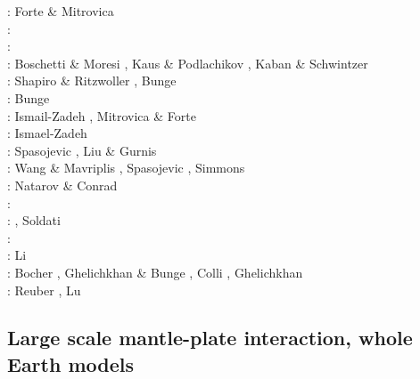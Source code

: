 \begin{scriptsize}
\nineteenninetysix: Forte \& Mitrovica \cite{fomi96} \\
\nineteenninetyeight: \cite{cava98}\\
\nineteenninetynine: \cite{samb99}\cite{samb99b}\\
\twothousandone: Boschetti \& Moresi \cite{bomo01}, Kaus \& Podlachikov \cite{kapo01}, 
                 Kaban \& Schwintzer \cite{kasc01}\\
\twothousandtwo: Shapiro \& Ritzwoller \cite{shri02}, Bunge \etal \cite{burb02}\\
\twothousandthree: Bunge \etal \cite{buht03}\\
\twothousandfour: Ismail-Zadeh \etal \cite{isst04}, Mitrovica \& Forte \cite{mifo04}\\
\twothousandseven: Ismael-Zadeh \etal \cite{isks07}\\
\twothousandeight: Spasojevic \etal \cite{splg08}, Liu \& Gurnis \cite{ligu08}\\
\twothousandnine: Wang \& Mavriplis \cite{wama09}, Spasojevic \etal \cite{splg09},
                  Simmons \etal \cite{sifg09}\\
\twothousandtwelve: Natarov \& Conrad \cite{naco12}\\
\twothousandfourteen: \cite{wosp14}\cite{hobo14}\cite{licl14}\\
\twothousandfifteen: \cite{wahg15}\cite{cobs15}\cite{vybu15}, Soldati \etal \cite{sobd15}\\
\twothousandsixteen: \cite{ghbu16}\cite{bocf16}\cite{yagu16}\cite{baum16}\cite{pric16}\\
\twothousandseventeen: Li \etal \cite{ligs17}\\
\twothousandeighteen: Bocher \etal \cite{bofc18}, Ghelichkhan \& Bunge \cite{ghbu18}, 
                      Colli \etal \cite{cogb18}, Ghelichkhan \etal \cite{ghmc18}\\
\twothousandtwenty: Reuber \etal \cite{rehp20}, Lu \etal{} \cite{lufs20}
\end{scriptsize}

\subsection{Large scale mantle-plate interaction, whole Earth models}

